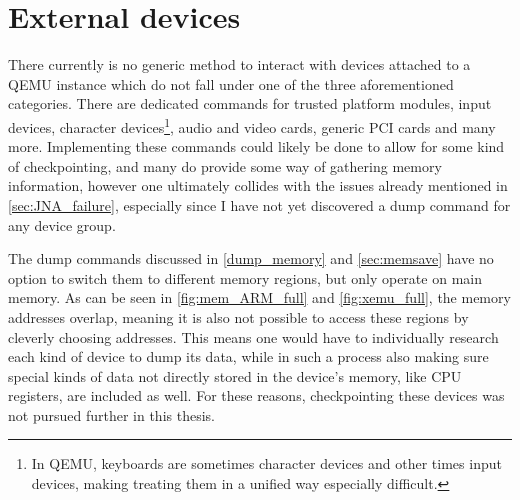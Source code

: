 \section{External devices}
There currently is no generic method to interact with devices attached to a QEMU instance
which do not fall under one of the three aforementioned categories.
There are dedicated commands for trusted platform modules, input devices, character devices\footnote{In QEMU, keyboards are sometimes character devices and other times input devices, making treating them in a unified way especially difficult.},
audio and video cards, generic PCI cards and many more\cite{qmp-commands}.
Implementing these commands could likely be done to allow for some kind of checkpointing,
and many do provide some way of gathering memory information,
however one ultimately collides with the issues already mentioned in \autoref{sec:JNA_failure},
especially since I have not yet discovered a dump command for any device group.

The dump commands discussed in \autoref{dump_memory} and \autoref{sec:memsave}
have no option to switch them to different memory regions, but only operate on main memory.
As can be seen in \autoref{fig:mem_ARM_full} and \autoref{fig:xemu_full},
the memory addresses overlap, meaning it is also not possible to access these regions
by cleverly choosing addresses.
This means one would have to individually research each kind of device to dump its data,
while in such a process also making sure special kinds of data not directly stored in the device's memory,
like CPU registers, are included as well.
For these reasons, checkpointing these devices was not pursued further in this thesis.